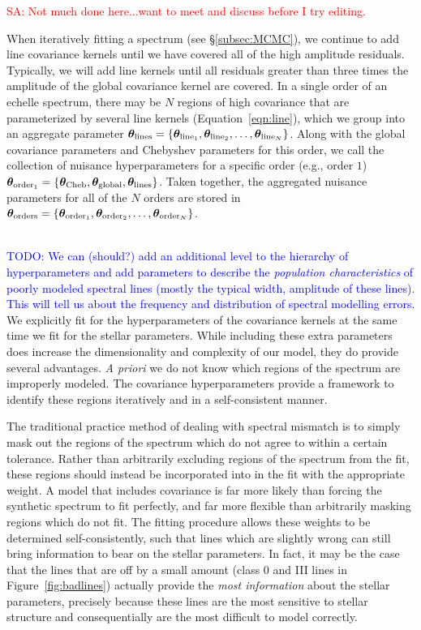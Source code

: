 \documentclass[iop,floatfix]{emulateapj}
\newcommand{\vt}{ {\bm \theta}}
\newcommand{\vtcheb}{\vt_{\rm Cheb}}
\newcommand{\vtglobal}{\vt_{\rm global}}
\newcommand{\vtorder}[1]{\vt_{{\rm order}_{#1}}}
\newcommand{\vtorders}{\vt_{\rm orders}}
\newcommand{\vtline}[1]{\vt_{{\rm line}_{#1}}}
\newcommand{\vtlines}{\vt_{\rm lines}}
\newcommand{\todo}[1]{ \textcolor{Blue}{\\TODO: #1}}
\newcommand{\comm}[1]{ \textcolor{Red}{SA: #1}}
\begin{document}
\comm{Not much done here...want to meet and discuss before I try editing.}

When iteratively fitting a spectrum (see \S\ref{subsec:MCMC}), we continue to add line covariance kernels until we have covered all of the high amplitude residuals. Typically, we will add line kernels until all residuals greater than three times the amplitude of the global covariance kernel are covered. In a single order of an echelle spectrum, there may be $N$ regions of high covariance that are parameterized by several line kernels (Equation~\ref{eqn:line}), which we group into an aggregate parameter $\vtlines = \{\vtline{1}, \vtline{2}, \ldots, \vtline{N}\}$. Along with the global covariance parameters and Chebyshev parameters for this order, we call the collection of nuisance hyperparameters for a specific order  (e.g., order $1$) $\vtorder{1} = \{\vtcheb, \vtglobal, \vtlines\}$. Taken together, the aggregated nuisance parameters for all of the $N$ orders are stored in $\vtorders = \{\vtorder{1}, \vtorder{2}, \ldots, \vtorder{N} \}$.

\todo{We can (should?) add an additional level to the hierarchy of
  hyperparameters and add parameters to describe the \emph{population
  characteristics} of poorly modeled spectral lines (mostly the typical width,
  amplitude of these lines).  This will tell us about the frequency and
distribution of spectral modelling errors.} We explicitly fit for the
hyperparameters of the covariance kernels at the same time we fit for the
stellar parameters. While including these extra parameters does increase the
dimensionality and complexity of our model, they do provide several advantages.
\emph{A priori} we do not know which regions of the spectrum are improperly
modeled. The covariance hyperparameters provide a framework to identify these
regions iteratively and in a self-consistent manner. 

The traditional practice method of dealing with spectral mismatch is to simply mask out the regions of the spectrum which do not agree to within a certain tolerance.  Rather than arbitrarily excluding regions of the spectrum from the fit, these regions should instead be incorporated into in the fit with the appropriate weight. A model that includes covariance is far more likely than forcing the synthetic spectrum to fit perfectly, and far more flexible than arbitrarily masking regions which do not fit. The fitting procedure allows these weights to be determined self-consistently, such that lines which are slightly wrong can still bring information to bear on the stellar parameters. In fact, it may be the case that the lines that are off by a small amount (class 0 and III lines in Figure~\ref{fig:badlines}) actually provide the \emph{most information} about the stellar parameters, precisely because these lines are the most sensitive to stellar structure and consequentially are the most difficult to model correctly.
\end{document}
